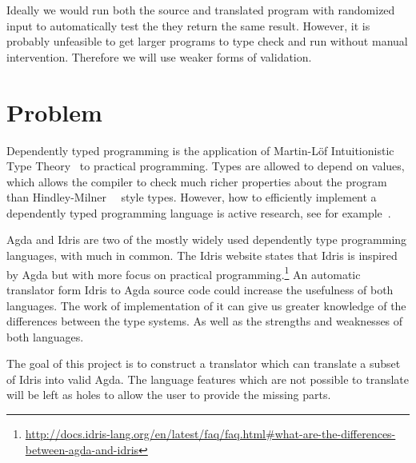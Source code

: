 \documentclass[parskip=half]{scrartcl}
\begin{document}
Ideally we would run both the source and translated program with randomized
input to automatically test the they return the same result. However, it is
probably unfeasible to get larger programs to type check and run without manual
intervention.  Therefore we will use weaker forms of validation.

\section{Problem}

Dependently typed programming is the application of Martin-Löf
Intuitionistic Type Theory~\cite{martinlof} to practical programming.
Types are allowed to depend on values, which allows the compiler to check much
richer properties about the program than Hindley-Milner~\cite{hindley}~\cite{milner}
style types. However, how to efficiently implement a dependently typed
programming language is active research, see for
example~\cite{quantitative-type-theory}.

Agda and Idris are two of the mostly widely used dependently type programming
languages, with much in common. The Idris website states that Idris is inspired
by Agda but with more focus on practical
programming.\footnote{\url{http://docs.idris-lang.org/en/latest/faq/faq.html\#what-are-the-differences-between-agda-and-idris}}
An automatic translator form Idris to Agda source code could increase the
usefulness of both languages. The work of implementation of it can give us
greater knowledge of the differences between the type systems. As well as the
strengths and weaknesses of both languages.

The goal of this project is to construct a translator which can translate
a subset of Idris into valid Agda. The language features which are not possible
to translate will be left as holes to allow the user to provide the missing
parts.


\end{document}
